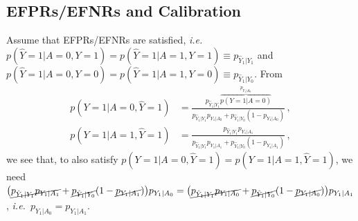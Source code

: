 \documentclass[runningheads]{llncs}
\newcommand{\ie}{\emph{i.e.}}
\begin{document}
\begin{subappendices}
\section{EFPRs/EFNRs and Calibration\label{sec:EFPRFNRC}}
Assume that EFPRs/EFNRs are satisfied, \ie~$p(\hat Y = 1 |A=0, Y=1)=p(\hat Y =1|A=1, Y=1)\equiv p_{\hat Y_1|Y_1}$ and 
$p(\hat Y = 1 |A=0, Y=0)=p(\hat Y =1|A=1, Y=0)\equiv p_{\hat Y_1|Y_0}$. From\\[-14pt]
\begin{align*}
p(Y = 1 |A=0, \hat Y=1)&= \frac{p_{\hat Y_1|Y_1}\overbrace{p(Y=1|A=0)}^{p_{Y_1|A_0}}}{p_{\hat Y_1|Y_1}p_{Y_1|A_0}+p_{\hat Y_1|Y_0}(1-p_{Y_1|A_0})}\,,\\
p(Y = 1 |A=1, \hat Y=1)&=  \frac{p_{\hat Y_1|Y_{1}}p_{Y_1|A_1}}{p_{\hat Y_1|Y_{1}}p_{Y_1|A_1}+p_{\hat Y_1|Y_0}(1-p_{Y_1|A_1})}\,,
\end{align*}
we see that, to also satisfy $p(Y = 1 |A=0, \hat Y=1) = p(Y = 1 |A=1, \hat Y=1)$, we need $\big(\cancel{p_{\hat Y_1|Y_{1}}p_{Y_1|A_1}}+\cancel{p_{\hat Y_1|Y_0}}(1-\cancel{p_{Y_1|A_1}})\big)p_{Y_1|A_0}=\big(\cancel{p_{\hat Y_1|Y_1}p_{Y_1|A_0}}+\cancel{p_{\hat Y_1|Y_0}}(1-\cancel{p_{Y_1|A_0}})\big)p_{Y_1|A_1}$, \ie~$p_{Y_1|A_0} = p_{Y_1|A_1}$. 

\end{subappendices}


\end{document}
